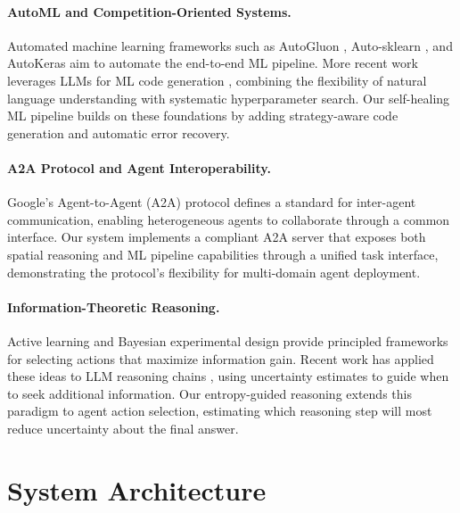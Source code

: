 \documentclass[11pt]{article}
\begin{document}
\paragraph{AutoML and Competition-Oriented Systems.}
Automated machine learning frameworks such as AutoGluon \citep{erickson2020autogluon}, Auto-sklearn \citep{feurer2019autosklearn}, and AutoKeras \citep{jin2023autokeras} aim to automate the end-to-end ML pipeline. More recent work leverages LLMs for ML code generation \citep{hollmann2024llmautoml}, combining the flexibility of natural language understanding with systematic hyperparameter search. Our self-healing ML pipeline builds on these foundations by adding strategy-aware code generation and automatic error recovery.

\paragraph{A2A Protocol and Agent Interoperability.}
Google's Agent-to-Agent (A2A) protocol \citep{google2024a2a} defines a standard for inter-agent communication, enabling heterogeneous agents to collaborate through a common interface. Our system implements a compliant A2A server that exposes both spatial reasoning and ML pipeline capabilities through a unified task interface, demonstrating the protocol's flexibility for multi-domain agent deployment.

\paragraph{Information-Theoretic Reasoning.}
Active learning \citep{settles2009active} and Bayesian experimental design \citep{chaloner1995bayesian} provide principled frameworks for selecting actions that maximize information gain. Recent work has applied these ideas to LLM reasoning chains \citep{xie2024active}, using uncertainty estimates to guide when to seek additional information. Our entropy-guided reasoning extends this paradigm to agent action selection, estimating which reasoning step will most reduce uncertainty about the final answer.

\section{System Architecture}
\label{sec:architecture}
\end{document}
